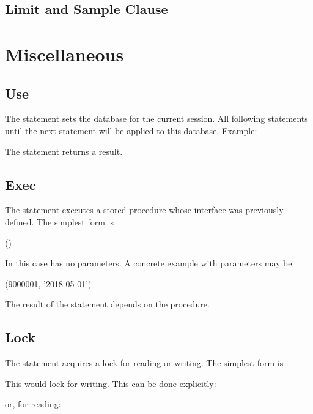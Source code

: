 
\subsection{Limit and Sample Clause}

\section{Miscellaneous}
\subsection{Use}
The  statement sets the database for
the current session. All following statements
 until the next  statement
will be applied to this database.
Example:

 

The statement returns a  result.

\subsection{Exec}
The  statement executes a stored procedure
whose interface was previously defined.
The simplest form is

 ()

In this case  has no parameters.
A concrete example with parameters may be

 (9000001, '2018-05-01')

The result of the statement depends on the procedure.

\subsection{Lock}
The  statement acquires a lock
for reading or writing. The simplest form is

 

This would lock  for writing.
This can be done explicitly:

  

or, for reading:

  

